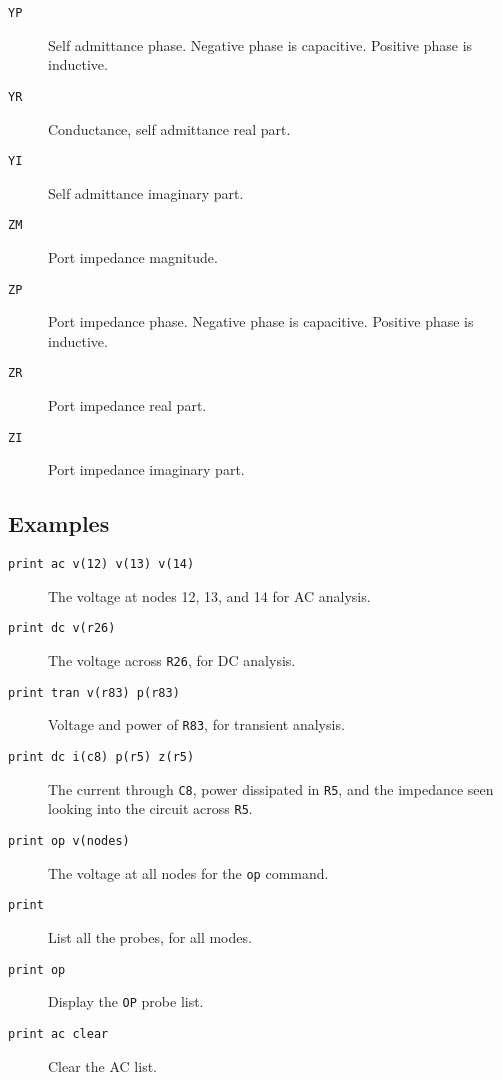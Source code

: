 \begin{description}
\item[{\tt YP}] Self admittance phase.
Negative phase is capacitive.  Positive phase is inductive.

\item[{\tt YR}] Conductance, self admittance real part.

\item[{\tt YI}] Self admittance imaginary part.

\item[{\tt ZM}] Port impedance magnitude.

\item[{\tt ZP}] Port impedance phase.
Negative phase is capacitive.  Positive phase is inductive.

\item[{\tt ZR}] Port impedance real part.

\item[{\tt ZI}] Port impedance imaginary part.

\end{description}
\subsection{Examples}

\begin{description}

\item[{\tt print ac v(12) v(13) v(14)}] The voltage at nodes 12, 13, and 14
for AC analysis.

\item[{\tt print dc v(r26)}] The voltage across {\tt R26}, for DC analysis.

\item[{\tt print tran v(r83) p(r83)}] Voltage and power of {\tt R83}, for
transient analysis.

\item[{\tt print dc i(c8) p(r5) z(r5)}] The current through {\tt C8}, power
dissipated in {\tt R5}, and the impedance seen looking into the circuit
across {\tt R5}.

\item[{\tt print op v(nodes)}] The voltage at all nodes for the {\tt op}
command.

\item[{\tt print}] List all the probes, for all modes.

\item[{\tt print op}] Display the {\tt OP} probe list.

\item[{\tt print ac clear}] Clear the AC list.

\end{description}
